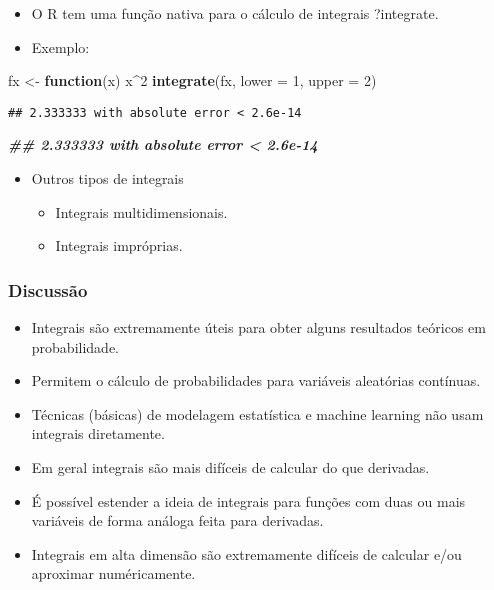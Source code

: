 \documentclass[
]{article}
\newenvironment{Shaded}{\begin{snugshade}}{\end{snugshade}}
\newcommand{\AttributeTok}[1]{\textcolor[rgb]{0.13,0.29,0.53}{#1}}
\newcommand{\ControlFlowTok}[1]{\textcolor[rgb]{0.13,0.29,0.53}{\textbf{#1}}}
\newcommand{\DecValTok}[1]{\textcolor[rgb]{0.00,0.00,0.81}{#1}}
\newcommand{\DocumentationTok}[1]{\textcolor[rgb]{0.56,0.35,0.01}{\textbf{\textit{#1}}}}
\newcommand{\FunctionTok}[1]{\textcolor[rgb]{0.13,0.29,0.53}{\textbf{#1}}}
\newcommand{\NormalTok}[1]{#1}
\newcommand{\OtherTok}[1]{\textcolor[rgb]{0.56,0.35,0.01}{#1}}
\newcommand{\SpecialCharTok}[1]{\textcolor[rgb]{0.81,0.36,0.00}{\textbf{#1}}}
\providecommand{\tightlist}{%
  \setlength{\itemsep}{0pt}\setlength{\parskip}{0pt}}
\begin{document}
\begin{itemize}
\tightlist
\item
  O R tem uma função nativa para o cálculo de integrais ?integrate.
\item
  Exemplo:
\end{itemize}

\begin{Shaded}
\begin{Highlighting}[]
\NormalTok{fx }\OtherTok{\textless{}{-}} \ControlFlowTok{function}\NormalTok{(x) x}\SpecialCharTok{\^{}}\DecValTok{2}
\FunctionTok{integrate}\NormalTok{(fx, }\AttributeTok{lower =} \DecValTok{1}\NormalTok{, }\AttributeTok{upper =} \DecValTok{2}\NormalTok{)}
\end{Highlighting}
\end{Shaded}

\begin{verbatim}
## 2.333333 with absolute error < 2.6e-14
\end{verbatim}

\begin{Shaded}
\begin{Highlighting}[]
\DocumentationTok{\#\# 2.333333 with absolute error \textless{} 2.6e{-}14}
\end{Highlighting}
\end{Shaded}

\begin{itemize}
\tightlist
\item
  Outros tipos de integrais

  \begin{itemize}
  \tightlist
  \item
    Integrais multidimensionais.
  \item
    Integrais impróprias.
  \end{itemize}
\end{itemize}

\hypertarget{discussuxe3o-1}{%
\subsubsection{Discussão}\label{discussuxe3o-1}}

\begin{itemize}
\tightlist
\item
  Integrais são extremamente úteis para obter alguns resultados teóricos
  em probabilidade.
\item
  Permitem o cálculo de probabilidades para variáveis aleatórias
  contínuas.
\item
  Técnicas (básicas) de modelagem estatística e machine learning não
  usam integrais diretamente.
\item
  Em geral integrais são mais difíceis de calcular do que derivadas.
\item
  É possível estender a ideia de integrais para funções com duas ou mais
  variáveis de forma análoga feita para derivadas.
\item
  Integrais em alta dimensão são extremamente difíceis de calcular e/ou
  aproximar numéricamente.
\end{itemize}
\end{document}
